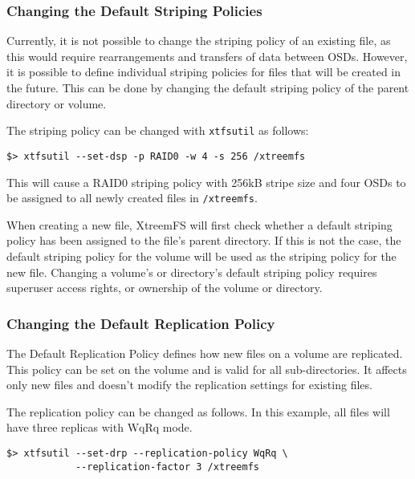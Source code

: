 \documentclass[a4paper,10pt]{book}
\begin{document}
\subsubsection{Changing the Default Striping Policies}

Currently, it is not possible to change the striping policy of an existing file, as this would require rearrangements and transfers of data between OSDs. However, it is possible to define individual striping policies for files that will be created in the future. This can be done by changing the default striping policy of the parent directory or volume.

The striping policy can be changed with \texttt{xtfsutil} as follows:

\begin{verbatim}
$> xtfsutil --set-dsp -p RAID0 -w 4 -s 256 /xtreemfs
\end{verbatim}

This will cause a RAID0 striping policy with 256kB stripe size and four OSDs to be assigned to all newly created files in \texttt{/xtreemfs}.

When creating a new file, XtreemFS will first check whether a default striping policy has been assigned to the file's parent directory. If this is not the case, the default striping policy for the volume will be used as the striping policy for the new file. Changing a volume's or directory's default striping policy requires superuser access rights, or ownership of the volume or directory.


\subsubsection{Changing the Default Replication Policy}

The Default Replication Policy defines how new files on a volume are replicated. This policy can be set on the volume and is valid for all sub-directories. It affects only new files and doesn't modify the replication settings for existing files.

The replication policy can be changed as follows. In this example, all files will have three replicas with WqRq mode.
\begin{verbatim}
$> xtfsutil --set-drp --replication-policy WqRq \
            --replication-factor 3 /xtreemfs
\end{verbatim}
\end{document}
